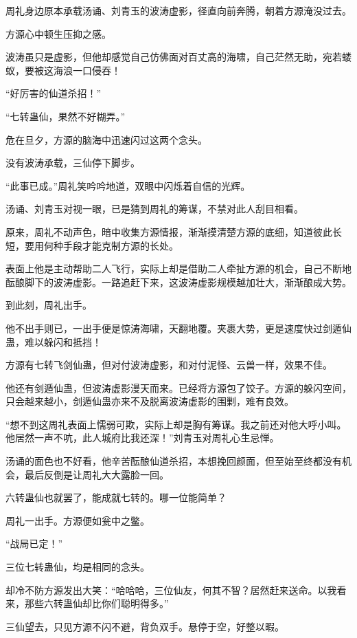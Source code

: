 
\begin{this_body}

周礼身边原本承载汤诵、刘青玉的波涛虚影，径直向前奔腾，朝着方源淹没过去。

方源心中顿生压抑之感。

波涛虽只是虚影，但他却感觉自己仿佛面对百丈高的海啸，自己茫然无助，宛若蝼蚁，要被这海浪一口侵吞！

“好厉害的仙道杀招！”

“七转蛊仙，果然不好糊弄。”

危在旦夕，方源的脑海中迅速闪过这两个念头。

没有波涛承载，三仙停下脚步。

“此事已成。”周礼笑吟吟地道，双眼中闪烁着自信的光辉。

汤诵、刘青玉对视一眼，已是猜到周礼的筹谋，不禁对此人刮目相看。

原来，周礼不动声色，暗中收集方源情报，渐渐摸清楚方源的底细，知道彼此长短，要用何种手段才能克制方源的长处。

表面上他是主动帮助二人飞行，实际上却是借助二人牵扯方源的机会，自己不断地酝酿脚下的波涛虚影。一路追赶下来，这波涛虚影规模越加壮大，渐渐酿成大势。

到此刻，周礼出手。

他不出手则已，一出手便是惊涛海啸，天翻地覆。夹裹大势，更是速度快过剑遁仙蛊，难以躲闪和抵挡！

方源有七转飞剑仙蛊，但对付波涛虚影，和对付泥怪、云兽一样，效果不佳。

他还有剑遁仙蛊，但波涛虚影漫天而来。已经将方源包了饺子。方源的躲闪空间，只会越来越小，剑遁仙蛊亦来不及脱离波涛虚影的围剿，难有良效。

“想不到这周礼表面上懦弱可欺，实际上却是胸有筹谋。我之前还对他大呼小叫。他居然一声不吭，此人城府比我还深！”刘青玉对周礼心生忌惮。

汤诵的面色也不好看，他辛苦酝酿仙道杀招，本想挽回颜面，但至始至终都没有机会，最后反倒是让周礼大大露脸一回。

六转蛊仙也就罢了，能成就七转的。哪一位能简单？

周礼一出手。方源便如瓮中之鳖。

“战局已定！”

三位七转蛊仙，均是相同的念头。

却冷不防方源发出大笑：“哈哈哈，三位仙友，何其不智？居然赶来送命。以我看来，那些六转蛊仙却比你们聪明得多。”

三仙望去，只见方源不闪不避，背负双手。悬停于空，好整以暇。


\end{this_body}
